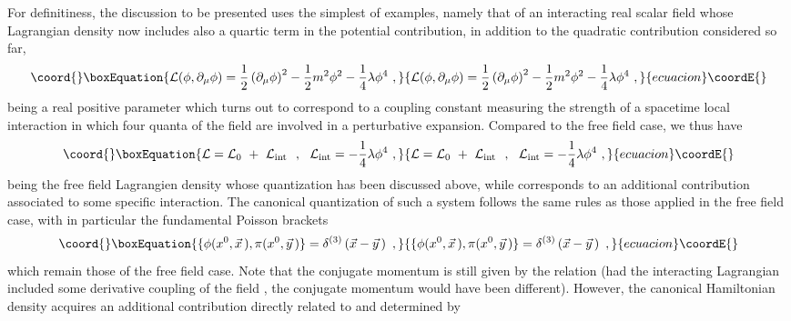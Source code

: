 \documentclass[a4paper,11pt]{article}
\begin{document}
For definitiness, the discussion to be presented uses the simplest of
examples, namely that of an interacting real scalar field \coordHE{}
whose Lagrangian density now includes also a quartic term in the
potential contribution, in addition to the quadratic contribution
considered so far,
\begin{equation}\coord{}\boxEquation{
{\cal L}(\phi,\partial_\mu\phi)=\frac{1}{2}\left(\partial_\mu\phi\right)^2-
\frac{1}{2}m^2\phi^2-\frac{1}{4}\lambda\phi^4\ ,
}{
{\cal L}(\phi,\partial_\mu\phi)=\frac{1}{2}\left(\partial_\mu\phi\right)^2-
\frac{1}{2}m^2\phi^2-\frac{1}{4}\lambda\phi^4\ ,
}{ecuacion}\coordE{}\end{equation}
\coordHE{} being a real positive parameter which turns out to correspond
to a coupling constant measuring the strength of a spacetime local interaction 
in which four quanta of the field \coordHE{} are involved in a perturbative 
expansion. Compared to the free field case, we thus have
\begin{equation}\coord{}\boxEquation{
{\cal L}={\cal L}_0\ +\ {\cal L}_{\rm int}\ \ ,\ \ 
{\cal L}_{\rm int}=-\frac{1}{4}\lambda\phi^4\ ,
}{
{\cal L}={\cal L}_0\ +\ {\cal L}_{\rm int}\ \ ,\ \ 
{\cal L}_{\rm int}=-\frac{1}{4}\lambda\phi^4\ ,
}{ecuacion}\coordE{}\end{equation}
\myHighlight{${\cal L}_0$}\coordHE{} being the free field Lagrangien density whose quantization
has been discussed above, while \coordHE{} corresponds
to an additional contribution associated to some specific interaction.
The canonical quantization of such a system follows the same rules as those
applied in the free field case, with in particular the fundamental
Poisson brackets
\begin{equation}\coord{}\boxEquation{
\{\phi(x^0,\vec{x}\,),\pi(x^0,\vec{y}\,)\}=
\delta^{(3)}\left(\vec{x}-\vec{y}\,\right)\ ,
}{
\{\phi(x^0,\vec{x}\,),\pi(x^0,\vec{y}\,)\}=
\delta^{(3)}\left(\vec{x}-\vec{y}\,\right)\ ,
}{ecuacion}\coordE{}\end{equation}
which remain those of the free field case. Note that the conjugate momentum
is still given by the relation \coordHE{} (had
the interacting Lagrangian \myHighlight{${\cal L}_{\rm int}$}\coordHE{} included some derivative 
coupling of the field \myHighlight{$\phi$}\coordHE{}, the conjugate momentum would have been 
different). However, the canonical Hamiltonian density acquires an 
additional contribution directly related to and determined by 
\end{document}
